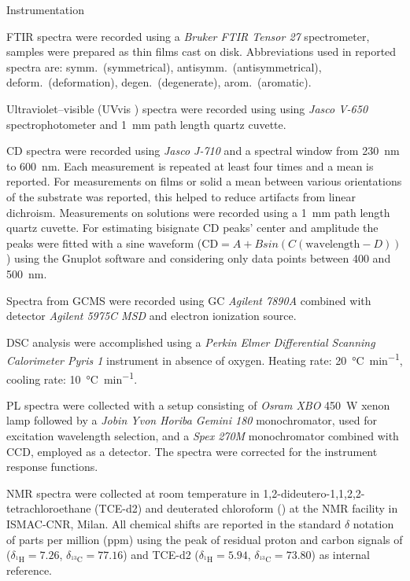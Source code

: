 \begin{section}{Instrumentation}

\Acrfull{FTIR} spectra were recorded using a \emph{Bruker \gls{FTIR} Tensor 27} spectrometer, samples were prepared as thin films cast on  disk. Abbreviations used in reported spectra are: symm.\ (symmetrical), antisymm.\ (antisymmetrical), deform.\ (deformation), degen.\ (degenerate), arom.\ (aromatic).

Ultraviolet--visible (\gls{UVvis} ) spectra were recorded using using \emph{Jasco V-650} spectrophotometer and \SI{1}{\mm} path length quartz cuvette.

\label{fitting}
\Acrfull{CD} spectra were recorded using \emph{Jasco J-710} and a spectral window from \SI{230}{\nm} to \SI{600}{\nm}. Each measurement is repeated at least four times and a mean is reported. For measurements on films or solid a mean between various orientations of the substrate was reported, this helped to reduce artifacts from linear dichroism. Measurements on solutions were recorded using a \SI{1}{\mm} path length quartz cuvette. For estimating bisignate \gls{CD} peaks' center and amplitude the peaks were fitted with a sine waveform ($\mathrm{CD}= A+Bsin(C(\mathrm{wavelength}-D))$) using the Gnuplot software and considering only data points between 400 and \SI{500}{\nm}.

Spectra from \acrfull{GCMS} were recorded using GC \emph{Agilent 7890A} combined with detector 
\emph{Agilent 5975C MSD} and electron ionization source.

\Acrfull{DSC} analysis were accomplished using a \emph{Perkin Elmer Differential Scanning Calorimeter Pyris 1} instrument in absence of oxy\-gen. Heating rate: \SI{20}{\celsius\per\minute}, cooling rate: \SI{10}{\celsius\per\minute}.

\Acrfull{PL} spectra were collected with a setup consisting of \emph{Osram XBO} \SI{450}{\W} xenon lamp followed by a \emph{Jobin Yvon Horiba Gemini 180} monochromator, used for excitation wavelength selection, and a \emph{Spex 270M} monochromator combined with CCD, employed as a detector. The spectra were corrected for the instrument response functions. 

\Acrfull{NMR} spectra were collected at room temperature in 1,2-di\-deutero-1,1,2,2-tetra\-chloro\-ethane (\gls{TCE}-d2) and deuterated chloroform () at the \gls{NMR} facility in ISMAC-CNR, Milan. All chemical shifts are reported in the standard $\delta$ notation of parts per million (ppm) using the peak of residual proton and carbon signals of  ($\delta _{^1\mathrm{H}} = 7.26$, $\delta_{^{13}\mathrm{C}}=77.16$) and \gls{TCE}-d2 ($\delta _{^{1}\mathrm{H}}=5.94$, $\delta _{^{13}\mathrm{C}}=73.80$) as internal reference.


\end{section}
